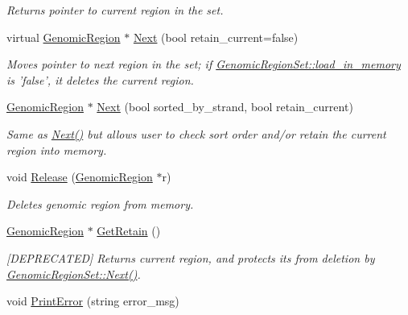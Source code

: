 \begin{DoxyCompactItemize}
\begin{DoxyCompactList}\small\item\em Returns pointer to current region in the set. \end{DoxyCompactList}\item 
virtual \hyperlink{classGenomicRegion}{GenomicRegion} $\ast$ \hyperlink{classGenomicRegionSet_a43326ec3c27a0c5c2c8b617509078ff7}{Next} (bool retain\_\-current=false)
\begin{DoxyCompactList}\small\item\em Moves pointer to next region in the set; if \hyperlink{classGenomicRegionSet_ade43c6cd72b95da75395129b00a52687}{GenomicRegionSet::load\_\-in\_\-memory} is 'false', it deletes the current region. \end{DoxyCompactList}\item 
\hyperlink{classGenomicRegion}{GenomicRegion} $\ast$ \hyperlink{classGenomicRegionSet_a84c1a9021f1eed8516945abd071e982d}{Next} (bool sorted\_\-by\_\-strand, bool retain\_\-current)
\begin{DoxyCompactList}\small\item\em Same as \hyperlink{classGenomicRegionSet_a43326ec3c27a0c5c2c8b617509078ff7}{Next()} but allows user to check sort order and/or retain the current region into memory. \end{DoxyCompactList}\item 
\hypertarget{classGenomicRegionSet_a8993c741ef2513ba5c5b88eb390f1f99}{
void \hyperlink{classGenomicRegionSet_a8993c741ef2513ba5c5b88eb390f1f99}{Release} (\hyperlink{classGenomicRegion}{GenomicRegion} $\ast$r)}
\label{classGenomicRegionSet_a8993c741ef2513ba5c5b88eb390f1f99}

\begin{DoxyCompactList}\small\item\em Deletes genomic region from memory. \end{DoxyCompactList}\item 
\hypertarget{classGenomicRegionSet_ad7dfea15eb8968d376771d74e042f3a1}{
\hyperlink{classGenomicRegion}{GenomicRegion} $\ast$ \hyperlink{classGenomicRegionSet_ad7dfea15eb8968d376771d74e042f3a1}{GetRetain} ()}
\label{classGenomicRegionSet_ad7dfea15eb8968d376771d74e042f3a1}

\begin{DoxyCompactList}\small\item\em \mbox{[}DEPRECATED\mbox{]} Returns current region, and protects its from deletion by \hyperlink{classGenomicRegionSet_a43326ec3c27a0c5c2c8b617509078ff7}{GenomicRegionSet::Next()}. \end{DoxyCompactList}\item 
\hypertarget{classGenomicRegionSet_a39c746333affb32acffbf0f31b7f6fcf}{
void \hyperlink{classGenomicRegionSet_a39c746333affb32acffbf0f31b7f6fcf}{PrintError} (string error\_\-msg)}
\label{classGenomicRegionSet_a39c746333affb32acffbf0f31b7f6fcf}


\end{DoxyCompactItemize}

